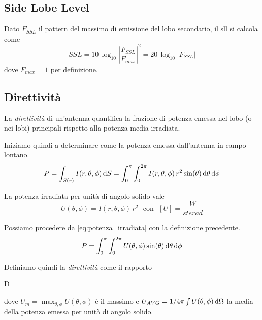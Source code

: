 \subsection{Side Lobe Level}
Dato $F_{SSL}$ il pattern del massimo di emissione del lobo secondario, il \gls{sll} si calcola come
\begin{equation}\label{eq:SLL}
	SSL=10 \, \log_{10}\left|\frac{F_{SSL}}{F_{max}}\right|^2 = 20 \, \log_{10} |F_{SSL}|
\end{equation}
dove $F_{max}=1$ per definizione.

\subsection{Direttività}
La \emph{direttività} di un'antenna quantifica la frazione di potenza emessa nel lobo (o nei lobi) principali rispetto alla potenza media irradiata.

Iniziamo quindi a determinare come la potenza emessa dall'antenna in campo lontano.
\begin{equation} \label{eq:potenza_irradiata}
	P= \int_{S(r)} I(r,\theta,\phi) \mathop{}\!\mathrm{d} S =\int_0^\pi\int_0^{2\pi} I(r,\theta,\phi) \, r^2 \sin(\theta) \mathop{}\!\mathrm{d} \theta \mathop{}\!\mathrm{d} \phi
\end{equation}

La potenza irradiata per unità di angolo solido vale
\begin{equation*}
	U(\theta,\phi) = I(r,\theta,\phi) \, r^2
	\text{~ con ~}
	[U] = \frac{W}{sterad}
\end{equation*}


Possiamo procedere da \autoref{eq:potenza_irradiata} con la definizione precedente.
\begin{equation}
	P = \int_0^\pi \int_0^{2\pi} U(\theta,\phi) \sin(\theta) \mathop{}\!\mathrm{d} \theta \mathop{}\!\mathrm{d} \phi
\end{equation}

Definiamo quindi la \emph{direttività} come il rapporto
\begin{esp}\label{eq:dirett}
	D
	= 
	= 
\end{esp}
dove $U_m = \max_{\theta,\phi} U(\theta,\phi)$ è il massimo e $U_{AVG} = 1/{4\pi} \int U(\theta,\phi) \mathop{}\!\mathrm{d} \Omega$ la media della potenza emessa per unità di angolo solido.

